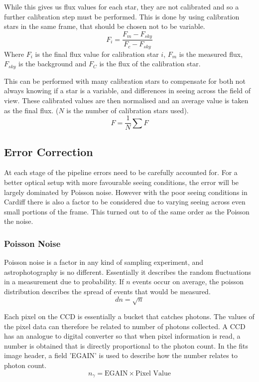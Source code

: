 While this gives us flux values for each star, they are not calibrated and so a further calibration step must be performed. This is done by using calibration stars in the same frame, that should be chosen not to be variable.
\[ F_i = \frac{F_m - F_{sky}}{F_c - F_{sky}} \]
Where $F_i$ is the final flux value for calibration star $i$, $F_m$ is the measured flux, $F_{sky}$ is the background and $F_C$ is the flux of the calibration star.

This can be performed with many calibration stars to compensate for both not always knowing if a star is a variable, and  differences in seeing across the field of view. These calibrated values are then normalised and an average value is taken as the final flux. ($N$ is the number of calibration stars used).
\[ F = \frac{1}{N}\sum{F} \]

\subsection{Error Correction}

At each stage of the pipeline errors need to be carefully accounted for. For a better optical setup with more favourable seeing conditions, the error will be largely dominated by Poisson noise. However with the poor seeing conditions in Cardiff there is also a factor to be considered due to varying seeing across even small portions of the frame. This turned out to of the same order as the Poisson the noise.

\subsubsection{Poisson Noise}

Poisson noise is a factor in any kind of sampling experiment, and astrophotography is no different. Essentially it describes the random fluctuations in a measurement due to probability. If $n$ events occur on average, the poisson distribution describes the spread of events that would be measured.
\[ dn = \sqrt{n} \]

Each pixel on the CCD is essentially a bucket that catches photons. The values of the pixel data can therefore be related to number of photons collected. A CCD has an analogue to digital converter so that when pixel information is read, a number is obtained that is directly proportional to the photon count. In the fits image header, a field 'EGAIN' is used to describe how the number relates to photon count.
\[ n_\gamma = \text{EGAIN} \times \text{Pixel Value} \]

